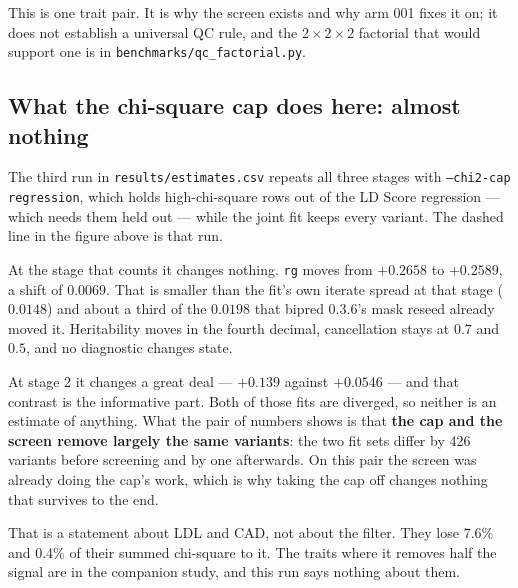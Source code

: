 This is one trait pair. It is why the screen exists and why arm 001 fixes it
on; it does not establish a universal QC rule, and the
$2 \times 2 \times 2$ factorial that would support one is in
\texttt{benchmarks/qc\_factorial.py}.

\subsection*{What the chi-square cap does here: almost nothing}

The third run in \texttt{results/estimates.csv} repeats all three stages with
\texttt{--chi2-cap regression}, which holds high-chi-square rows out of the LD Score
regression --- which needs them held out --- while the joint fit keeps every
variant. The dashed line in the figure above is that run.

At the stage that counts it changes nothing. \texttt{rg} moves from $+0.2658$
to $+0.2589$, a shift of $0.0069$. That is smaller than the fit's own iterate
spread at that stage ($0.0148$) and about a third of the $0.0198$ that bipred
0.3.6's mask reseed already moved it. Heritability moves in the fourth decimal,
cancellation stays at $0.7$ and $0.5$, and no diagnostic changes state.

At stage 2 it changes a great deal --- $+0.139$ against $+0.0546$ --- and that
contrast is the informative part. Both of those fits are diverged, so neither
is an estimate of anything. What the pair of numbers shows is that
\textbf{the cap and the screen remove largely the same variants}: the two fit
sets differ by 426 variants before screening and by one afterwards. On this
pair the screen was already doing the cap's work, which is why taking the cap
off changes nothing that survives to the end.

That is a statement about LDL and CAD, not about the filter. They lose 7.6\%
and 0.4\% of their summed chi-square to it. The traits where it removes half
the signal are in the companion study, and this run says nothing about them.
